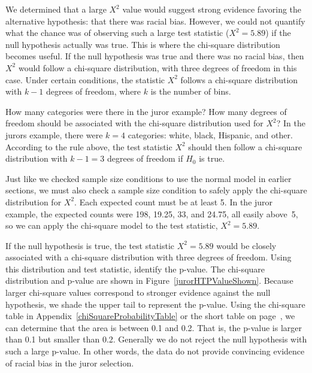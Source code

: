 We determined that a large $X^2$ value would suggest strong evidence favoring the alternative hypothesis: that there was racial bias. However, we could not quantify what the chance was of observing such a large test statistic ($X^2=5.89$) if the null hypothesis actually was true. This is where the chi-square distribution becomes useful. If the null hypothesis was true and there was no racial bias, then $X^2$ would follow a chi-square distribution, with three degrees of freedom in this case. Under certain conditions, the statistic $X^2$ follows a chi-square distribution with $k - 1$ degrees of freedom, where $k$ is the number of bins.

\begin{examplewrap}
\begin{nexample}{How many categories were there in the juror example? How many degrees of freedom should be associated with the chi-square distribution used for $X^2$?}
In the jurors example, there were $k=4$ categories: white, black, Hispanic, and other. According to the rule above, the test statistic $X^2$ should then follow a chi-square distribution with $k-1 = 3$ degrees of freedom if $H_0$ is true.
\end{nexample}
\end{examplewrap}

Just like we checked sample size conditions to use the normal model in earlier sections, we must also check a sample size condition to safely apply the chi-square distribution for $X^2$. Each expected count must be at least 5. In the juror example, the expected counts were 198, 19.25, 33, and 24.75, all easily above~5, so we can apply the chi-square model to the test statistic, $X^2=5.89$.

\begin{examplewrap}
\begin{nexample}{If the null hypothesis is true, the test statistic $X^2=5.89$ would be closely associated with a chi-square distribution with three degrees of freedom. Using this distribution and test statistic, identify the p-value.}
The chi-square distribution and p-value are shown in Figure~\ref{jurorHTPValueShown}. Because larger chi-square values correspond to stronger evidence against the null hypothesis, we shade the upper tail to represent the p-value. Using the chi-square table in Appendix~\ref{chiSquareProbabilityTable} or the short table on page~\pageref{chiSquareProbabilityTableShort}, we can determine that the area is between 0.1 and 0.2. That is, the p-value is larger than 0.1 but smaller than 0.2. Generally we do not reject the null hypothesis with such a large p-value. In other words, the data do not provide convincing evidence of racial bias in the juror selection.
\end{nexample}
\end{examplewrap}

